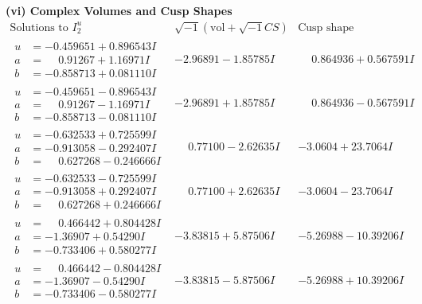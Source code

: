\documentclass[1p]{elsarticle_modified}
\theoremstyle{definition}
\newcommand{\I}{\sqrt{-1}}
\begin{document}
\newpage\flushleft \textbf{(vi) Complex Volumes and Cusp Shapes}
$$\begin{array}{c|c|c}  
\text{Solutions to }I^u_{2}& \I (\text{vol} + \sqrt{-1}CS) & \text{Cusp shape}\\
 \hline 
\begin{aligned}
u &= -0.459651 + 0.896543 I \\
a &= \phantom{-}0.91267 + 1.16971 I \\
b &= -0.858713 + 0.081110 I\end{aligned}
 & -2.96891 - 1.85785 I & \phantom{-}0.864936 + 0.567591 I \\ \hline\begin{aligned}
u &= -0.459651 - 0.896543 I \\
a &= \phantom{-}0.91267 - 1.16971 I \\
b &= -0.858713 - 0.081110 I\end{aligned}
 & -2.96891 + 1.85785 I & \phantom{-}0.864936 - 0.567591 I \\ \hline\begin{aligned}
u &= -0.632533 + 0.725599 I \\
a &= -0.913058 - 0.292407 I \\
b &= \phantom{-}0.627268 - 0.246666 I\end{aligned}
 & \phantom{-}0.77100 - 2.62635 I & -3.0604 + 23.7064 I \\ \hline\begin{aligned}
u &= -0.632533 - 0.725599 I \\
a &= -0.913058 + 0.292407 I \\
b &= \phantom{-}0.627268 + 0.246666 I\end{aligned}
 & \phantom{-}0.77100 + 2.62635 I & -3.0604 - 23.7064 I \\ \hline\begin{aligned}
u &= \phantom{-}0.466442 + 0.804428 I \\
a &= -1.36907 + 0.54290 I \\
b &= -0.733406 + 0.580277 I\end{aligned}
 & -3.83815 + 5.87506 I & -5.26988 - 10.39206 I \\ \hline\begin{aligned}
u &= \phantom{-}0.466442 - 0.804428 I \\
a &= -1.36907 - 0.54290 I \\
b &= -0.733406 - 0.580277 I\end{aligned}
 & -3.83815 - 5.87506 I & -5.26988 + 10.39206 I \\ \hline\begin{aligned}

\end{aligned}
\end{array}$$
\end{document}
